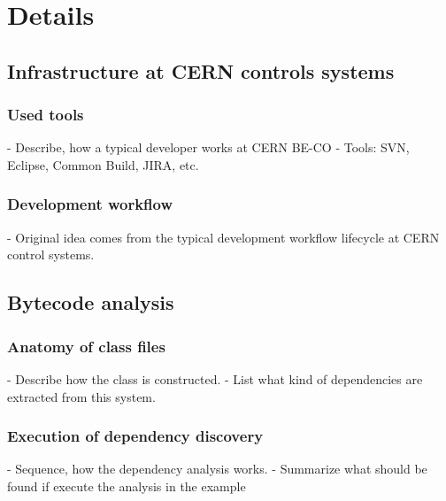 \chapter{Details}

\section{Infrastructure at CERN controls systems}

\subsection{Used tools}
- Describe, how a typical developer works at CERN BE-CO 
- Tools: SVN, Eclipse, Common Build, JIRA, etc. %

\subsection{Development workflow}
- Original idea comes from the typical development workflow lifecycle at CERN
control systems. %

\section{Bytecode analysis}

\subsection{Anatomy of class files}
- Describe how the class is constructed.
- List what kind of dependencies are extracted from this system. 

\subsection{Execution of dependency discovery}
- Sequence, how the dependency analysis works. 
- Summarize what should be found if execute the analysis in the example

